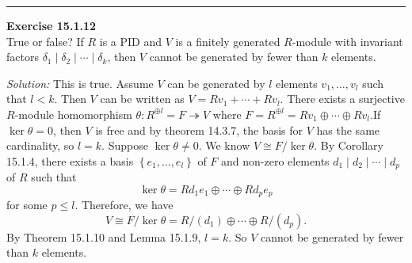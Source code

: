 \documentclass[a4paper, 12pt]{article}
\newenvironment{problem}[2][Exercise]
    { \begin{mdframed}[backgroundcolor=gray!20] \textbf{#1 #2} \\}
    {  \end{mdframed}}
\newenvironment{solution}
    {\textit{Solution:}}
    {}
\begin{document}
\noindent\rule{7in}{2.8pt}
\begin{problem}{15.1.12}
True or false? If \(R\) is a PID and \(V\) is a finitely generated \(R\)-module with invariant factors \(\delta_1\mid \delta_2\mid \cdots\mid \delta_k\), then 
\(V\) cannot be generated by fewer than \(k\) elements.
\end{problem}
\begin{solution}
This is true. Assume \(V\) can be generated by \(l\) elements \(v_1,\ldots,v_l\) such that \(l<k\). Then \(V\) can be written as \(V=Rv_1+\cdots+Rv_l\). There exists a surjective 
\(R\)-module homomorphism \(\theta:R^{\oplus l}=F\twoheadrightarrow V\) where \(F=R^{\oplus l}=Rv_1\oplus \cdots\oplus Rv_l\).If \(\ker \theta=0\), then \(V\) is free and by theorem 14.3.7, the basis for \(V\) has the same cardinality, so \(l=k\). Suppose \(\ker \theta\neq 0\). 
We know \(V\cong F/\ker \theta\). By Corollary 15.1.4, there exists a basis \(\left\{ e_1,\ldots,e_l \right\}\) of \(F\) and non-zero elements \(d_1\mid d_2\mid\cdots\mid d_p\) of \(R\) such that 
\[\ker\theta=Rd_1e_1\oplus \cdots\oplus Rd_pe_p\]
for some \(p\leq l\). Therefore, we have 
\[V\cong F/\ker \theta=R/(d_1)\oplus \cdots\oplus R/(d_p).\]
By Theorem 15.1.10 and Lemma 15.1.9, \(l=k\). So \(V\) cannot be generated by fewer than \(k\) elements. 
\end{solution}
\end{document}
